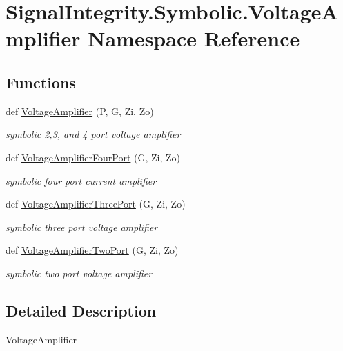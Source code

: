 \hypertarget{namespaceSignalIntegrity_1_1Symbolic_1_1VoltageAmplifier}{}\section{Signal\+Integrity.\+Symbolic.\+Voltage\+Amplifier Namespace Reference}
\label{namespaceSignalIntegrity_1_1Symbolic_1_1VoltageAmplifier}
\subsection*{Functions}
\begin{DoxyCompactItemize}
\item 
def \hyperlink{namespaceSignalIntegrity_1_1Symbolic_1_1VoltageAmplifier_a90103e03e13f29d7e6da5783dc111342}{Voltage\+Amplifier} (P, G, Zi, Zo)
\begin{DoxyCompactList}\small\item\em symbolic 2,3, and 4 port voltage amplifier \end{DoxyCompactList}\item 
def \hyperlink{namespaceSignalIntegrity_1_1Symbolic_1_1VoltageAmplifier_ab34bf649da424bdb14b682c34913b47b}{Voltage\+Amplifier\+Four\+Port} (G, Zi, Zo)
\begin{DoxyCompactList}\small\item\em symbolic four port current amplifier \end{DoxyCompactList}\item 
def \hyperlink{namespaceSignalIntegrity_1_1Symbolic_1_1VoltageAmplifier_a7f57e1dc4df8fb907e739cc3e18d47a4}{Voltage\+Amplifier\+Three\+Port} (G, Zi, Zo)
\begin{DoxyCompactList}\small\item\em symbolic three port voltage amplifier \end{DoxyCompactList}\item 
def \hyperlink{namespaceSignalIntegrity_1_1Symbolic_1_1VoltageAmplifier_a1a423622c458ebf9e8ac8e62e4260846}{Voltage\+Amplifier\+Two\+Port} (G, Zi, Zo)
\begin{DoxyCompactList}\small\item\em symbolic two port voltage amplifier \end{DoxyCompactList}\end{DoxyCompactItemize}


\subsection{Detailed Description}
\begin{DoxyVerb}VoltageAmplifier\end{DoxyVerb}
 

